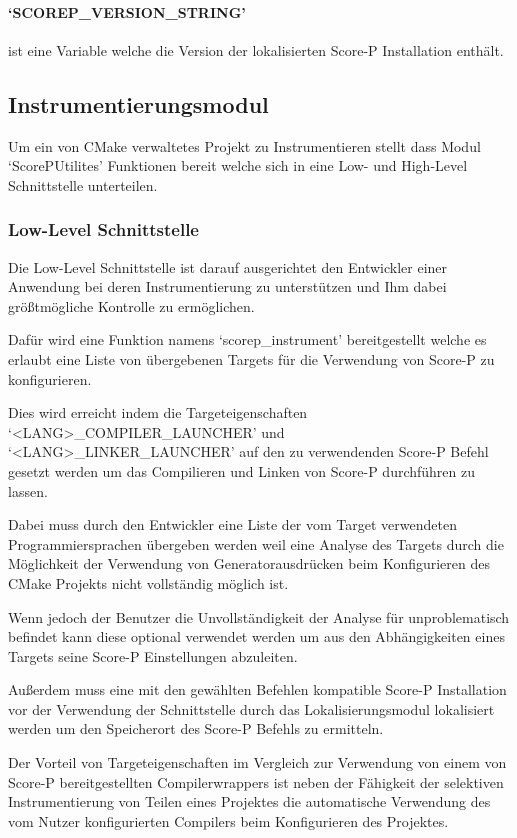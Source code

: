 \documentclass[german,proseminar,hyperref,utf8]{zihpub}
\begin{document}
    \paragraph{`SCOREP\_VERSION\_STRING'} ist eine Variable welche die Version der lokalisierten
    Score-P Installation enthält.

    \subsection{Instrumentierungsmodul}
    Um ein von CMake verwaltetes Projekt zu Instrumentieren stellt dass Modul `ScorePUtilites'
    Funktionen bereit welche sich in eine Low- und High-Level Schnittstelle unterteilen.

    \subsubsection{Low-Level Schnittstelle}
    Die Low-Level Schnittstelle ist darauf ausgerichtet den Entwickler einer Anwendung bei deren
    Instrumentierung zu unterstützen und Ihm dabei grö{\ss}tmögliche Kontrolle zu ermöglichen.

    Dafür wird eine Funktion namens `scorep\_instrument' bereitgestellt welche es erlaubt eine Liste
    von übergebenen Targets für die Verwendung von Score-P zu konfigurieren.

    Dies wird erreicht indem die Targeteigenschaften `<LANG>\_COMPILER\_LAUNCHER' und
    `<LANG>\_LINKER\_LAUNCHER' auf den zu verwendenden Score-P Befehl gesetzt werden um
    das Compilieren und Linken von Score-P durchführen zu lassen.

    Dabei muss durch den Entwickler eine Liste der vom Target verwendeten Programmiersprachen übergeben
    werden weil eine Analyse des Targets durch die Möglichkeit der Verwendung von Generatorausdrücken 
    beim Konfigurieren des CMake Projekts nicht vollständig möglich ist.

    Wenn jedoch der Benutzer die Unvollständigkeit der Analyse für unproblematisch befindet
    kann diese optional verwendet werden um aus den Abhängigkeiten eines Targets seine Score-P
    Einstellungen abzuleiten.

    Au{\ss}erdem muss eine mit den gewählten Befehlen kompatible Score-P Installation vor der Verwendung
    der Schnittstelle durch das Lokalisierungsmodul lokalisiert werden um den Speicherort des
    Score-P Befehls zu ermitteln.

    Der Vorteil von Targeteigenschaften im Vergleich zur Verwendung von einem von Score-P bereitgestellten
    Compilerwrappers ist neben der Fähigkeit der selektiven Instrumentierung von Teilen eines Projektes
    die automatische Verwendung des vom Nutzer konfigurierten Compilers beim Konfigurieren des Projektes.
\end{document}
